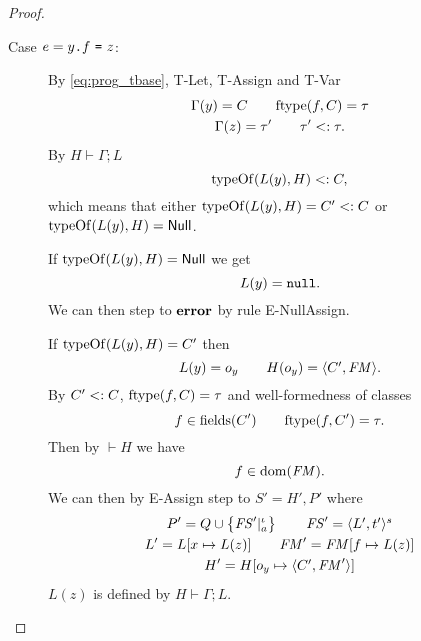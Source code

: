 \begin{proof}
\begin{description}
\begin{description}
        \item[Case $e = \mbox{\mdseries$y$\texttt{.}$f$~\texttt{=}~$z$}$:]
          By \eqref{eq:prog_tbase}, {\sc T-Let}, {\sc T-Assign} and {\sc T-Var}
          \begin{equation*}
            \begin{gathered}
              \Gamma(y) = C \quad\quad \mbox{$\mathrm{ftype}$}(f,C) = \tau  \\
              \Gamma(z) = \tau' \quad\quad \tau' <: \tau.
            \end{gathered}
          \end{equation*}
          By $H \vdash \Gamma;L$
          \begin{equation*}
            \mbox{$\mathrm{typeOf}$}(L(y), H) <: C,
          \end{equation*}
          which means that either $\mbox{$\mathrm{typeOf}$}(L(y), H) = C' <: C$ or \\
          $\mbox{$\mathrm{typeOf}$}(L(y), H) = \mbox{$\mathsf{Null}$}$.

          If $\mbox{$\mathrm{typeOf}$}(L(y), H) = \mbox{$\mathsf{Null}$}$ we get
          \begin{equation*}
            L(y) = \mbox{\mdseries\texttt{null}}.
          \end{equation*}
          We can then step to $\mbox{{\bf error}}$ by rule {\sc E-NullAssign}.
          \contradiction

          If $\mbox{$\mathrm{typeOf}$}(L(y), H) = C'$ then
          \begin{equation*}
            L(y) = o_y \quad\quad H(o_y) = \mbox{$\langle C', \mathit{FM} \rangle$}.
          \end{equation*}
          By $C' <: C$, $\mbox{$\mathrm{ftype}$}(f, C) = \tau$ and well-formedness of classes
          \begin{equation*}
            f \in \mbox{$\mathrm{fields}$}(C') \quad\quad \mbox{$\mathrm{ftype}$}(f, C') = \tau.
          \end{equation*}
          Then by $\vdash H$ we have 
          \begin{equation*}
            f \in \mbox{$\mathrm{dom}$}(\mathit{FM}).
          \end{equation*}
          We can then by {\sc E-Assign} step to $S' = H', P'$ where
          \begin{equation*}
            \begin{gathered}
              P' = Q \cup \left\{\mathit{FS}'|_a^\iota \right\} \quad\quad \mathit{FS}' = \mbox{$\langle L',
              t' \rangle^s$} \\
              L' = L[x \mapsto L(z)] \quad\quad \mathit{FM}' = \mathit{FM}[f \mapsto L(z)] \\
              H' = H[o_y \mapsto \mbox{$\langle C', \mathit{FM}' \rangle$}]
            \end{gathered}
          \end{equation*}
          $L(z)$ is defined by $H \vdash \Gamma; L$. \contradiction


\end{description}
\end{description}
\end{proof}
